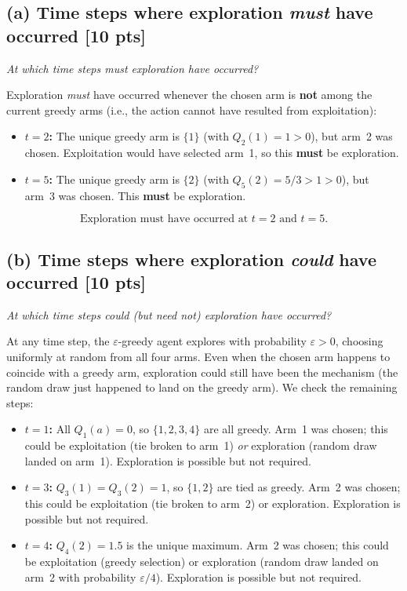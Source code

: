 \documentclass[12pt]{article}
\begin{document}
\subsection*{(a) Time steps where exploration \emph{must} have occurred \hfill [10 pts]}

\textit{At which time steps must exploration have occurred?}

Exploration \emph{must} have occurred whenever the chosen arm is \textbf{not} among the current greedy arms (i.e., the action cannot have resulted from exploitation):

\begin{itemize}[nosep]
  \item \textbf{$t = 2$:} The unique greedy arm is $\{1\}$ (with $Q_2(1) = 1 > 0$), but arm~2 was chosen. Exploitation would have selected arm~1, so this \textbf{must} be exploration.
  \item \textbf{$t = 5$:} The unique greedy arm is $\{2\}$ (with $Q_5(2) = 5/3 > 1 > 0$), but arm~3 was chosen. This \textbf{must} be exploration.
\end{itemize}

\[
  \boxed{\text{Exploration must have occurred at } t = 2 \text{ and } t = 5.}
\]

\subsection*{(b) Time steps where exploration \emph{could} have occurred \hfill [10 pts]}

\textit{At which time steps could (but need not) exploration have occurred?}

At any time step, the $\varepsilon$-greedy agent explores with probability $\varepsilon > 0$, choosing uniformly at random from all four arms. Even when the chosen arm happens to coincide with a greedy arm, exploration could still have been the mechanism (the random draw just happened to land on the greedy arm). We check the remaining steps:

\begin{itemize}[nosep]
  \item \textbf{$t = 1$:} All $Q_1(a) = 0$, so $\{1,2,3,4\}$ are all greedy. Arm~1 was chosen; this could be exploitation (tie broken to arm~1) \emph{or} exploration (random draw landed on arm~1). Exploration is possible but not required.
  \item \textbf{$t = 3$:} $Q_3(1) = Q_3(2) = 1$, so $\{1, 2\}$ are tied as greedy. Arm~2 was chosen; this could be exploitation (tie broken to arm~2) or exploration. Exploration is possible but not required.
  \item \textbf{$t = 4$:} $Q_4(2) = 1.5$ is the unique maximum. Arm~2 was chosen; this could be exploitation (greedy selection) or exploration (random draw landed on arm~2 with probability $\varepsilon/4$). Exploration is possible but not required.
\end{itemize}
\end{document}

